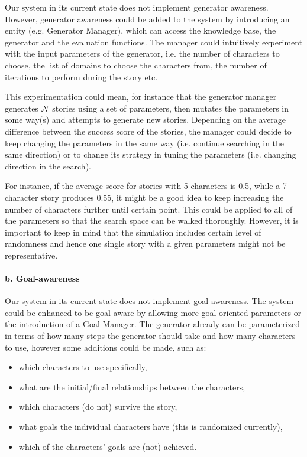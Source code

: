 \documentclass[english]{tktltiki}
\begin{document}
    Our system in its current state does not implement generator awareness. However, generator awareness could be added to the system by introducing an entity (e.g. Generator Manager), which can access the knowledge base, the generator and the evaluation functions. The manager could intuitively experiment with the input parameters of the generator, i.e. the number of characters to choose, the list of domains to choose the characters from, the number of iterations to perform during the story etc.

    This experimentation could mean, for instance that the generator manager generates $\mathcal{N}$ stories using a set of parameters, then mutates the parameters in some way(s) and attempts to generate new stories. Depending on the average difference between the success score of the stories, the manager could decide to keep changing the parameters in the same way (i.e. continue searching in the same direction) or to change its strategy in tuning the parameters (i.e. changing direction in the search). 
    
    For instance, if the average score for stories with 5 characters is 0.5, while a 7-character story produces 0.55, it might be a good idea to keep increasing the number of characters further until certain point. This could be applied to all of the parameters so that the search space can be walked thoroughly. However, it is important to keep in mind that the simulation includes certain level of randomness and hence one single story with a given parameters might not be representative.
    
    \paragraph{b. Goal-awareness} 
    Our system in its current state does not implement goal awareness. The system could be enhanced to be goal aware by allowing more goal-oriented parameters or the introduction of a Goal Manager. The generator already can be parameterized in terms of how many steps the generator should take and how many characters to use, however some additions could be made, such as: 

    \begin{itemize}
        \item which characters to use specifically,
        \item what are the initial/final relationships between the characters,
        \item which characters (do not) survive the story,
        \item what goals the individual characters have (this is randomized currently),
        \item which of the characters' goals are (not) achieved.
    \end{itemize}
\end{document}

